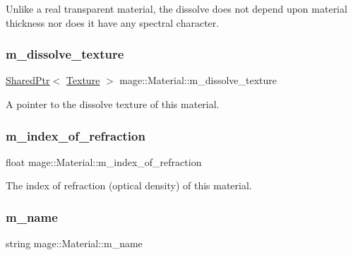 Unlike a real transparent material, the dissolve does not depend upon material thickness nor does it have any spectral character. \hypertarget{structmage_1_1_material_aa68e02ed3da6000effc3aadcc99fa4b5}{}\label{structmage_1_1_material_aa68e02ed3da6000effc3aadcc99fa4b5} 
\subsubsection{\texorpdfstring{m\+\_\+dissolve\+\_\+texture}{m\_dissolve\_texture}}
{\footnotesize\ttfamily \hyperlink{namespacemage_a1e01ae66713838a7a67d30e44c67703e}{Shared\+Ptr}$<$ \hyperlink{classmage_1_1_texture}{Texture} $>$ mage\+::\+Material\+::m\+\_\+dissolve\+\_\+texture\hspace{0.3cm}{\ttfamily [private]}}

A pointer to the dissolve texture of this material. \hypertarget{structmage_1_1_material_a8b584541ab8bfc527f856c68bb0152e7}{}\label{structmage_1_1_material_a8b584541ab8bfc527f856c68bb0152e7} 
\subsubsection{\texorpdfstring{m\+\_\+index\+\_\+of\+\_\+refraction}{m\_index\_of\_refraction}}
{\footnotesize\ttfamily float mage\+::\+Material\+::m\+\_\+index\+\_\+of\+\_\+refraction\hspace{0.3cm}{\ttfamily [private]}}

The index of refraction (optical density) of this material. \hypertarget{structmage_1_1_material_a2b3e839a8ae093d53b12529d61ec6605}{}\label{structmage_1_1_material_a2b3e839a8ae093d53b12529d61ec6605} 
\subsubsection{\texorpdfstring{m\+\_\+name}{m\_name}}
{\footnotesize\ttfamily string mage\+::\+Material\+::m\+\_\+name\hspace{0.3cm}{\ttfamily [private]}}

